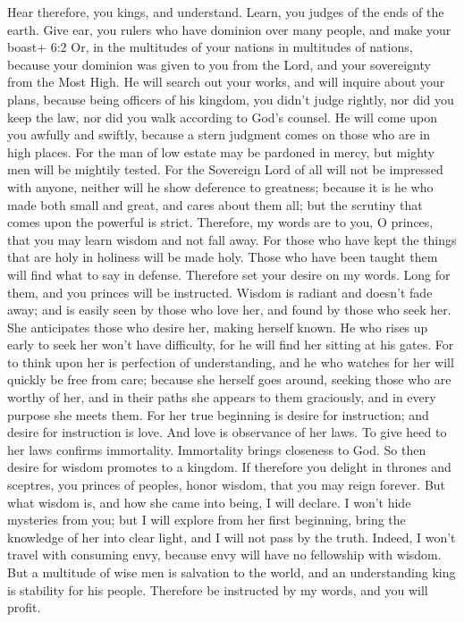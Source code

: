  Hear therefore, you kings, and understand. Learn, you
judges of the ends of the earth.  Give ear, you rulers who
have dominion over many people, and make your boast+ 6:2 Or, in the
multitudes of your nations in multitudes of nations, 
because your dominion was given to you from the Lord, and your
sovereignty from the Most High. He will search out your works, and will
inquire about your plans,  because being officers of his
kingdom, you didn't judge rightly, nor did you keep the law, nor did you
walk according to God's counsel.  He will come upon you
awfully and swiftly, because a stern judgment comes on those who are in
high places.  For the man of low estate may be pardoned in
mercy, but mighty men will be mightily tested.  For the
Sovereign Lord of all will not be impressed with anyone, neither will he
show deference to greatness; because it is he who made both small and
great, and cares about them all;  but the scrutiny that
comes upon the powerful is strict.  Therefore, my words are
to you, O princes, that you may learn wisdom and not fall away.
 For those who have kept the things that are holy in
holiness will be made holy. Those who have been taught them will find
what to say in defense.  Therefore set your desire on my
words. Long for them, and you princes will be instructed. 
Wisdom is radiant and doesn't fade away; and is easily seen by those who
love her, and found by those who seek her.  She anticipates
those who desire her, making herself known.  He who rises
up early to seek her won't have difficulty, for he will find her sitting
at his gates.  For to think upon her is perfection of
understanding, and he who watches for her will quickly be free from
care;  because she herself goes around, seeking those who
are worthy of her, and in their paths she appears to them graciously,
and in every purpose she meets them.  For her true
beginning is desire for instruction; and desire for instruction is love.
 And love is observance of her laws. To give heed to her
laws confirms immortality.  Immortality brings closeness to
God.  So then desire for wisdom promotes to a kingdom.
 If therefore you delight in thrones and sceptres, you
princes of peoples, honor wisdom, that you may reign forever.
 But what wisdom is, and how she came into being, I will
declare. I won't hide mysteries from you; but I will explore from her
first beginning, bring the knowledge of her into clear light, and I will
not pass by the truth.  Indeed, I won't travel with
consuming envy, because envy will have no fellowship with wisdom.
 But a multitude of wise men is salvation to the world, and
an understanding king is stability for his people. 
Therefore be instructed by my words, and you will profit.

